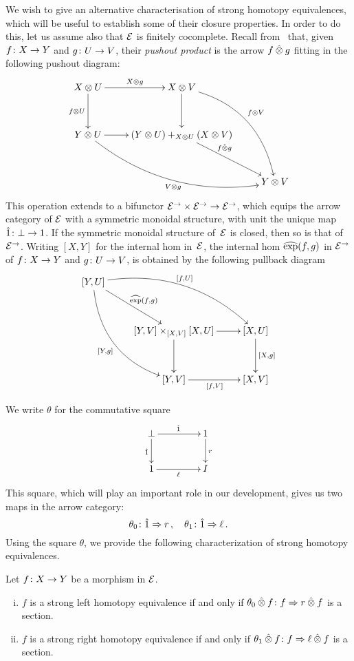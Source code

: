 \documentclass[reqno,10pt,a4paper,oneside]{amsart}
\begin{document}
We wish to give an alternative characterisation of strong homotopy equivalences, which will be useful to establish some of their closure properties. In order to do this,  let us assume also that $\mathcal{E}$ is finitely cocomplete. Recall from~\cite[Section 4]{riehl-verity:reedy} that, given $f \colon X \to Y$ and $g \colon U \to V$, their \emph{pushout product} is the arrow $f \mathbin{\hat{\otimes}} g$ fitting in the following pushout diagram:
\[
\xymatrix@R=1.2cm{
X \otimes U \ar[r]^{X \otimes g}  \ar[d]_{f \otimes U} & X \otimes V \ar@/^2pc/[ddr]^{f \otimes V} \ar[d] & \\ 
Y \otimes U \ar@/_2pc/[drr]_{V \otimes g} \ar[r] & (Y \otimes U) +_{X \otimes U} (X \otimes V) \ar[dr]^-(.35){f \hatotimes g}  & \\ 
 & & Y \otimes V} 
 \]
This operation extends to a bifunctor  $\mathcal{E}^{\to} \times \mathcal{E}^{\to} \to \mathcal{E}^{\to}$, which equips the arrow category of $\mathcal{E}$ with a symmetric monoidal structure, with unit the unique map $\hat{1} \colon \bot \to 1$.  If the symmetric
monoidal structure of~$\mathcal{E}$ is closed, then so is that of $\mathcal{E}^\to$. Writing $[X,Y]$ for the internal hom in~$\mathcal{E}$,
the internal hom $\operatorname{\widehat{exp}}(f,g)$ in $\mathcal{E}^\to$ of $f \colon X \to Y$ and $g \colon U \to V$, is obtained by the following 
pullback diagram
\[
\xymatrix@R=1.2cm{
[Y, U] \ar@/^2pc/[drr]^{[f,U]} \ar@/_2pc/[ddr]_{[Y,g]}  \ar[dr]^{\hatexp(f,g)} & & \\ 
 & [Y,V] \times_{[X,V]} [X,U]  \ar[d] \ar[r] & [X,U] \ar[d]^{[X,g]} \\
 & [Y,V] \ar[r]_{[f,V]} & [X,V] }
 \]

\medskip

We write $\theta$ for the  commutative square
\begin{equation}
\label{trivial-square}
\begin{gathered}
\xymatrix@C+2em{
  \initial
  \ar[r]^{\hatunit}
  \ar[d]_{\hatunit}
&
  \unit
  \ar[d]^{\intervalr}
\\
  \unit
  \ar[r]_{\intervall}
&
  \interval
}
\end{gathered}
\end{equation}
This square,  which will play an important role in  our development, gives us two maps in the arrow category: 
\[
\theta_{0} \colon \hat{1} \Rightarrow r  \, , \quad \theta_{1} \colon \hat{1} \Rightarrow \ell \,. 
\]
Using the square $\theta$, we provide the following  characterization of strong homotopy equivalences.

\begin{lemma}
\label{strong-h-equiv-as-section}
Let $f \colon X  \to Y$ be a morphism in $\mathcal{E}$.
\begin{enumerate}[(i)]
\item $f$ is a strong left homotopy equivalence if and only if $\theta_{0} \mathbin{\hat{\otimes}} f \colon f \Rightarrow r \mathbin{\hat{\otimes}} f$ is a section.
\item $f$ is a strong right homotopy equivalence if and only if $\theta_{1} \mathbin{\hat{\otimes}} f \colon f \Rightarrow  \ell \mathbin{\hat{\otimes}} f$ is a section.
\end{enumerate}
\end{lemma}
\end{document}
